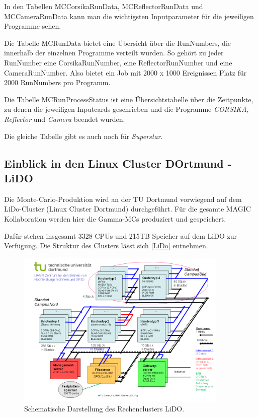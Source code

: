 In den Tabellen MCCorsikaRunData, MCReflectorRunData und MCCameraRunData kann man die wichtigsten Inputparameter für die jeweiligen Programme sehen.

Die Tabelle MCRunData bietet eine Übersicht über die RunNumbers, die innerhalb der einzelnen Programme verteilt wurden. 
So gehört zu jeder RunNumber eine CorsikaRunNumber, eine ReflectorRunNumber und eine CameraRunNumber.
Also bietet ein Job mit 2000 x 1000 Ereignissen Platz für 2000 RunNumbers pro Programm.

Die Tabelle MCRunProcessStatus ist eine Übersichtstabelle über die Zeitpunkte, zu denen die jeweiligen Inputcards geschrieben und die Programme \textit{CORSIKA}, \textit{Reflector} und \textit{Camera} beendet wurden.

Die gleiche Tabelle gibt es auch noch für \textit{Superstar}. 


\subsection{Einblick in den Linux Cluster DOrtmund - LiDO}
Die Monte-Carlo-Produktion wird an der TU Dortmund vorwiegend auf dem LiDo-Cluster (Linux Cluster Dortmund) durchgeführt. 
Für die gesamte MAGIC Kollaboration werden hier die Gamma-MCs produziert und gespeichert.

Dafür stehen insgesamt 3328 CPUs und 215TB Speicher auf dem LiDO zur Verfügung.
Die Struktur des Clusters lässt sich \autoref{LiDo} entnehmen.

\begin{figure}[!h]
    \centering
    \includegraphics[width=0.9\textwidth]{./Plots/03_MonteCarlos/LiDO.png}
    \caption{Schematische Darstellung des Rechenclusters LiDO.\cite{LiDO}}
    \label{LiDo}
\end{figure}


